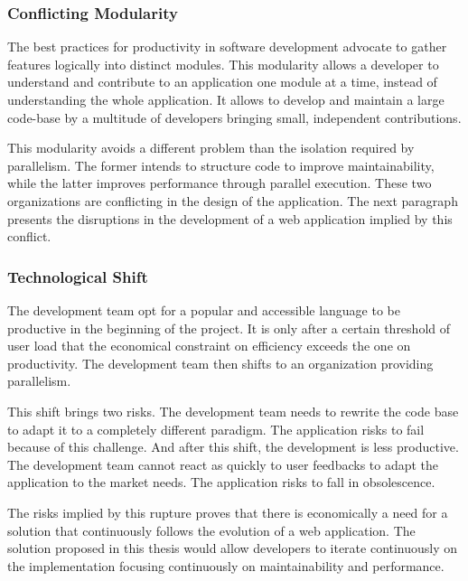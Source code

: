 \subsubsection{Conflicting Modularity}

The best practices for productivity in software development advocate to gather features logically into distinct modules.
This modularity allows a developer to understand and contribute to an application one module at a time, instead of understanding the whole application.
It allows to develop and maintain a large code-base by a multitude of developers bringing small, independent contributions.

This modularity avoids a different problem than the isolation required by parallelism.
The former intends to structure code to improve maintainability, while the latter improves performance through parallel execution.
These two organizations are conflicting in the design of the application.
The next paragraph presents the disruptions in the development of a web application implied by this conflict.

\subsubsection{Technological Shift}

The development team opt for a popular and accessible language to be productive in the beginning of the project. %
It is only after a certain threshold of user load that the economical constraint on efficiency exceeds the one on productivity.
The development team then shifts to an organization providing parallelism.

This shift brings two risks.
The development team needs to rewrite the code base to adapt it to a completely different paradigm.
The application risks to fail because of this challenge.
And after this shift, the development is less productive.
The development team cannot react as quickly to user feedbacks to adapt the application to the market needs.
The application risks to fall in obsolescence.

The risks implied by this rupture proves that there is economically a need for a solution that continuously follows the evolution of a web application.
The solution proposed in this thesis would allow developers to iterate continuously on the implementation focusing continuously on maintainability and performance.

